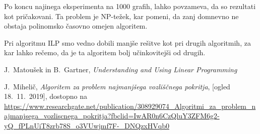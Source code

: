 \documentclass[12pt,a4paper]{amsart}
\theoremstyle{definition} %
\theoremstyle{plain} %
\begin{document}
Po koncu najinega eksperimenta na 1000 grafih, lahko povzameva, da so rezultati kot pričakovani. 
Ta problem je NP-težek, kar pomeni, da zanj domnevno ne obstaja polinomsko časovno omejen algoritem. 

Pri algoritmu ILP smo vedno dobili manjše rešitve kot pri drugih algoritmih, za kar lahko rečemo, da je ta algoritem bolj učinkovitejši od drugih.




\hspace*{\fill} %




\newpage
\begin{thebibliography}{}


J.~Matoušek in B.~Gartner, \emph{Understanding and Using Linear Programming}


 J.~Mihelič, \emph{Algoritem za problem najmanjšega vozliščnega pokritja}, [ogled 18.~11.~2019], dostopno na \url{https://www.researchgate.net/publication/308929074_Algoritmi_za_problem_najmanjsega_vozliscnega_pokritja?fbclid=IwAR0n6CzQluY3ZFM6g2-yQ_fPLnUiT8zrb78S_o3VUwjmf7F-_DNQzxHVqb0}




\end{thebibliography}{}
\end{document}
